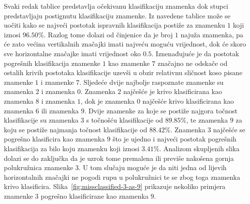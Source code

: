 \newline
Svaki redak tablice predstavlja očekivanu klasifikaciju znamenka dok stupci predstavljaju postignutu klasifikaciju
znamenke. Iz navedene tablice može se uočiti kako se najveći postotak ispravnih klasifikacija postiže za znamenku $1$
koji iznosi $96.50\%$. Razlog tome dolazi od činjenice da je broj $1$ najuža znamenka, pa će zato većina vertikalnih
značajki imati najveću moguću vrijednost, dok će skoro sve horizontalne značajke imati vrijednost oko $0.5$.
Iznenađujuće je da postotak pogrešnih klasifikacija znamenke $1$ kao znamenke $7$ značajno ne odskače od ostalih krivih
postotaka klasifikacije uzevši u obzir relativnu sličnost koso pisane znamenke $1$ i znamenke $7$. Sljedeće dvije
najbolje raspoznate znamenke su znamenka $2$ i znamenka $0$. Znamenka $2$ najčešće je krivo klasificirana kao znamenka
$8$ i znamenka $1$, dok je znamenka $0$ najčešće krivo klasificirana kao znamenka $6$ ili znamenka $9$. Dvije znamenke
za koje se postiže najgora točnost klasifikacije su znamenka $3$ s točnošću klasifikacije od $89.85\%$, te znamenka $9$
za koju se postiže najmanja točnost klasifikacije od $88.42\%$. Znamenka $3$ najčešće se pogrešno klasificira kao
znamenka $9$ što je ujedno i najveći postotak pogrešnih klasifikacija za bilo koju znamenku koji iznosi $3.41\%$.
Analizom skupljenih slika dolazi se do zaključka da je uzrok tome premalena ili previše nakošena gornja polukružnica
znamenke $3$. U tom slučaju moguće je da niti jedna od lijevih horizontalnih značajki ne pogodi rupu u polukružnici te
se zbog toga znamenka krivo klasificira. Slika\ \ref{fig:missclassified-3-as-9} prikazuje nekoliko primjera znamenke $3$
pogrešno klasificirane kao znamenka $9$.
